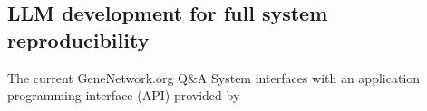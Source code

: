 \subsection{LLM development for full system reproducibility}
The current GeneNetwork.org Q\&A System interfaces with an application programming interface (API) provided by \openai